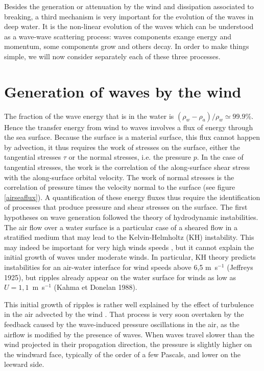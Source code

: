 

Besides the generation or attenuation by the wind and dissipation associated to breaking, a third mechanism is very important for the 
evolution of the waves in deep water. It is the non-linear evolution of the waves which can be understood as a wave-wave scattering process: waves components 
exange energy and momentum, some components grow and others decay. In order to make things simple, we will now consider separately each of these three processes. 

\section{Generation of waves by the wind}
The fraction of the wave energy that is in the water is $(\rho_w -\rho_a)/\rho_w \simeq 99.9$\%. Hence the transfer energy from wind to waves 
involves a flux of energy through the sea surface. Because the surface is a material surface, this flux cannot happen by advection, it thus requires the 
work of stresses on the surface, either the tangential stresses $\tau$ or the normal stresses, i.e. the pressure $p$. In the case of tangential stresses, 
the work is the correlation of 
the along-surface shear stress with the along-surface orbital velocity. The work of normal stresses is the correlation of pressure times the velocity normal to the surface
 (see figure \ref{airseaflux}). A quantification of these energy fluxes thus require the identification of processes that produce pressure and shear stresses on the surface. 
The first hypotheses on wave generation followed the theory of hydrodynamic instabilities. The air flow over a water surface is a particular case of a sheared flow in a stratified 
medium that may lead to the Kelvin-Helmholtz (KH) instability. This may indeed be important for very high winds speeds \citep{Soloviev&al.2014}, but it cannot explain the 
initial growth of waves under moderate winds. In particular, KH theory predicts instabilities for an air-water interface for wind speeds above 6,5 m~s$^{-1}$ (Jeffreys 1925), 
but ripples already appear on the water surface for winds as low as  $U= 1,1$~m~s$^{-1}$
(Kahma et Donelan 1988\nocite{Kahma&Donelan1988}). 

This initial growth of ripples is rather well explained by the effect of turbulence in the air advected by the wind \cite{Phillips1957}. 
That process is very soon overtaken by the feedback caused by the wave-induced pressure oscillations in the air, as the airflow is modified by the presence of waves. 
 When waves travel slower than the wind projected in their propagation direction, the pressure is slightly higher on the windward face, typically of the order of a few Pascals,
and lower on the leeward side. 


